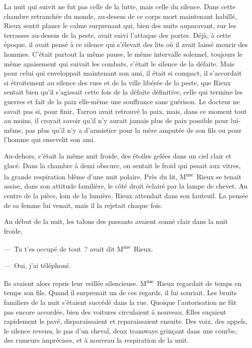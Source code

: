 \documentclass[french,twoside]{book} %
\begin{document}
La nuit qui suivit ne fut pas celle de la lutte, mais celle du silence. Dans cette chambre retranchée du monde, au-dessus de ce corps mort maintenant habillé, Rieux sentit planer le calme surprenant qui, bien des nuits auparavant, sur les terrasses au-dessus de la peste, avait suivi l’attaque des portes. Déjà, à cette époque, il avait pensé à ce silence qui s’élevait des lits où il avait laissé mourir des hommes. C’était partout la même pause, le même intervalle solennel, toujours le même apaisement qui suivait les combats, c’était le silence de la défaite. Mais pour celui qui enveloppait maintenant son ami, il était si compact, il s’accordait si étroitement au silence des rues et de la ville libérée de la peste, que Rieux sentait bien qu’il s’agissait cette fois de la défaite définitive, celle qui termine les guerres et fait de la paix elle-même une souffrance sans guérison. Le docteur ne savait pas si, pour finir, Tarrou avait retrouvé la paix, mais, dans ce moment tout au moins, il croyait savoir qu’il n’y aurait jamais plus de paix possible pour lui-même, pas plus qu’il n’y a d’armistice pour la mère amputée de son fils ou pour l’homme qui ensevelit son ami.\par
Au-dehors, c’était la même nuit froide, des étoiles gelées dans un ciel clair et glacé. Dans la chambre à demi obscure, on sentait le froid qui pesait aux vitres, la grande respiration blême d’une nuit polaire. Près du lit, M\textsuperscript{me} Rieux se tenait assise, dans son attitude familière, le côté droit éclairé par la lampe de chevet. Au centre de la pièce, loin de la lumière, Rieux attendait dans son fauteuil. La pensée de sa femme lui venait, mais il la rejetait chaque fois.\par
Au début de la nuit, les talons des passants avaient sonné clair dans la nuit froide.\par
— Tu t’es occupé de tout ? avait dit M\textsuperscript{me} Rieux.\par
— Oui, j’ai téléphoné.\par
Ils avaient alors repris leur veillée silencieuse. M\textsuperscript{me} Rieux regardait de temps en temps son fils. Quand il surprenait un de ces regards, il lui souriait. Les bruits familiers de la nuit s’étaient succédé dans la rue. Quoique l’autorisation ne fût pas encore accordée, bien des voitures circulaient à nouveau. Elles suçaient rapidement le pavé, disparaissaient et reparaissaient ensuite. Des voix, des appels, le silence revenu, le pas d’un cheval, deux tramways grinçant dans une courbe, des rumeurs imprécises, et à nouveau la respiration de la nuit.\par
\end{document}
